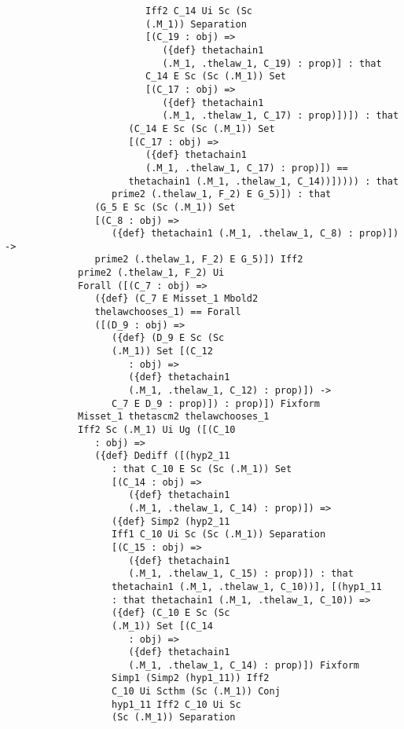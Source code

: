\documentclass[12pt]{article}
\begin{document}
\begin{verbatim}
                         Iff2 C_14 Ui Sc (Sc 
                         (.M_1)) Separation 
                         [(C_19 : obj) => 
                            ({def} thetachain1 
                            (.M_1, .thelaw_1, C_19) : prop)] : that 
                         C_14 E Sc (Sc (.M_1)) Set 
                         [(C_17 : obj) => 
                            ({def} thetachain1 
                            (.M_1, .thelaw_1, C_17) : prop)])]) : that 
                      (C_14 E Sc (Sc (.M_1)) Set 
                      [(C_17 : obj) => 
                         ({def} thetachain1 
                         (.M_1, .thelaw_1, C_17) : prop)]) == 
                      thetachain1 (.M_1, .thelaw_1, C_14))])))) : that 
                   prime2 (.thelaw_1, F_2) E G_5)]) : that 
                (G_5 E Sc (Sc (.M_1)) Set 
                [(C_8 : obj) => 
                   ({def} thetachain1 (.M_1, .thelaw_1, C_8) : prop)]) -> 
                prime2 (.thelaw_1, F_2) E G_5)]) Iff2 
             prime2 (.thelaw_1, F_2) Ui 
             Forall ([(C_7 : obj) => 
                ({def} (C_7 E Misset_1 Mbold2 
                thelawchooses_1) == Forall 
                ([(D_9 : obj) => 
                   ({def} (D_9 E Sc (Sc 
                   (.M_1)) Set [(C_12 
                      : obj) => 
                      ({def} thetachain1 
                      (.M_1, .thelaw_1, C_12) : prop)]) -> 
                   C_7 E D_9 : prop)]) : prop)]) Fixform 
             Misset_1 thetascm2 thelawchooses_1 
             Iff2 Sc (.M_1) Ui Ug ([(C_10 
                : obj) => 
                ({def} Dediff ([(hyp2_11 
                   : that C_10 E Sc (Sc (.M_1)) Set 
                   [(C_14 : obj) => 
                      ({def} thetachain1 
                      (.M_1, .thelaw_1, C_14) : prop)]) => 
                   ({def} Simp2 (hyp2_11 
                   Iff1 C_10 Ui Sc (Sc (.M_1)) Separation 
                   [(C_15 : obj) => 
                      ({def} thetachain1 
                      (.M_1, .thelaw_1, C_15) : prop)]) : that 
                   thetachain1 (.M_1, .thelaw_1, C_10))], [(hyp1_11 
                   : that thetachain1 (.M_1, .thelaw_1, C_10)) => 
                   ({def} (C_10 E Sc (Sc 
                   (.M_1)) Set [(C_14 
                      : obj) => 
                      ({def} thetachain1 
                      (.M_1, .thelaw_1, C_14) : prop)]) Fixform 
                   Simp1 (Simp2 (hyp1_11)) Iff2 
                   C_10 Ui Scthm (Sc (.M_1)) Conj 
                   hyp1_11 Iff2 C_10 Ui Sc 
                   (Sc (.M_1)) Separation 

\end{verbatim}
\end{document}
